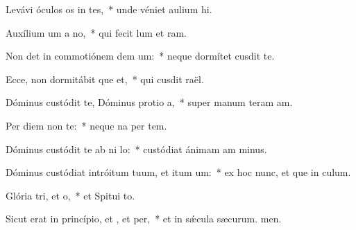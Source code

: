 \item Levávi óculos os in tes,~* unde véniet aulium hi.
\item Auxílium um a no,~* qui fecit lum et ram.
\item Non det in commotiónem dem um:~* neque dormítet  cusdit te.
\item Ecce, non dormitábit que et,~* qui cusdit raël.
\item Dóminus custódit te, Dóminus protio a,~* super manum teram am.
\item Per diem  non  te:~* neque na per tem.
\item Dóminus custódit te ab ni lo:~* custódiat ánimam am minus.
\item Dóminus custódiat intróitum tuum, et itum um:~* ex hoc nunc, et que in culum.
\item Glória tri, et o,~* et Spitui to.
\item Sicut erat in princípio, et , et per,~* et in sǽcula sæcurum. men.
